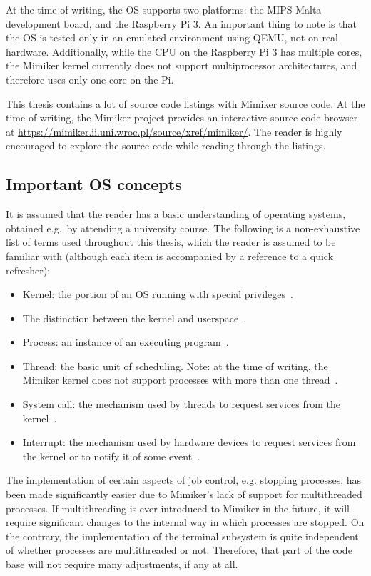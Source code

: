 \documentclass[shortabstract, manyadvisors, english, mgr]{iithesis}
\begin{document}
At the time of writing, the OS supports two platforms: the MIPS Malta
development board, and the Raspberry Pi 3. An important thing to note is that
the OS is tested only in an emulated environment using QEMU, not on real
hardware. Additionally, while the CPU on the Raspberry Pi 3 has multiple cores,
the Mimiker kernel currently does not support multiprocessor architectures,
and therefore uses only one core on the Pi.

This thesis contains a lot of source code listings with Mimiker source code. At
the time of writing, the Mimiker project provides an interactive source code
browser at \url{https://mimiker.ii.uni.wroc.pl/source/xref/mimiker/}. The reader
is highly encouraged to explore the source code while reading through the
listings.

\subsection{Important OS concepts}

It is assumed that the reader has a basic understanding of operating systems,
obtained e.g.\ by attending a university course. The following is a
non-exhaustive list of terms used throughout this thesis, which the reader is
assumed to be familiar with (although each item is accompanied by a reference to
a quick refresher):
\begin{itemize}
  \item Kernel: the portion of an OS running with special privileges~\cite[Section~1.1.3]{silberschatz}.
  \item The distinction between the kernel and userspace~\cite[Section~1.4.2]{silberschatz}.
  \item Process: an instance of an executing program~\cite[Section~1.4.1]{silberschatz}.
  \item Thread: the basic unit of scheduling. Note: at the time of writing, the
    Mimiker kernel does not support processes with more than one thread~\cite[Section~3.1.4]{silberschatz}.
  \item System call: the mechanism used by threads to request services from the
    kernel~\cite[Section~2.3]{silberschatz}.
  \item Interrupt: the mechanism used by hardware devices to request services
    from the kernel or to notify it of some event~\cite[Section~1.2.1]{silberschatz}.
\end{itemize}

The implementation of certain aspects of job control, e.g. stopping processes,
has been made significantly easier due to Mimiker's lack of support for
multithreaded processes. If multithreading is ever introduced to Mimiker in the
future, it will require significant changes to the internal way in which
processes are stopped. On the contrary, the implementation of the terminal
subsystem is quite independent of whether processes are multithreaded or not.
Therefore, that part of the code base will not require many adjustments, if any
at all.
\end{document}
